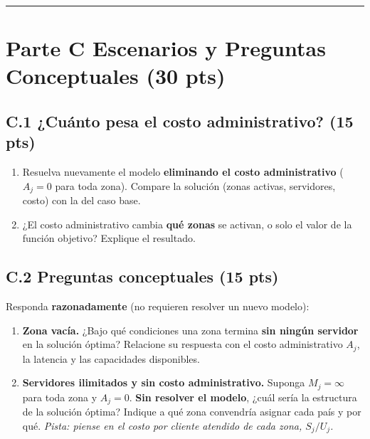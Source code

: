 \documentclass[12pt,a4paper]{article}
\begin{document}
\noindent\rule{\linewidth}{0.4pt}
\newpage
\section*{Parte C \quad Escenarios y Preguntas Conceptuales \hfill\normalfont\normalsize(30 pts)}

\subsection*{C.1 \quad ¿Cuánto pesa el costo administrativo? \hfill\normalfont\normalsize(15 pts)}

\begin{enumerate}[label=\alph*), leftmargin=*, topsep=2pt]
    \item Resuelva nuevamente el modelo \textbf{eliminando el costo
          administrativo} ($A_j = 0$ para toda zona). Compare la solución
          (zonas activas, servidores, costo) con la del caso base.
    \item ¿El costo administrativo cambia \textbf{qué zonas} se activan, o solo
          el valor de la función objetivo? Explique el resultado.
\end{enumerate}

\subsection*{C.2 \quad Preguntas conceptuales \hfill\normalfont\normalsize(15 pts)}

Responda \textbf{razonadamente} (no requieren resolver un nuevo modelo):

\begin{enumerate}[label=\alph*), leftmargin=*, topsep=2pt]
    \item \textbf{Zona vacía.} ¿Bajo qué condiciones una zona termina
          \textbf{sin ningún servidor} en la solución óptima? Relacione su
          respuesta con el costo administrativo $A_j$, la latencia y las
          capacidades disponibles.
    \item \textbf{Servidores ilimitados y sin costo administrativo.} Suponga
          $M_j = \infty$ para toda zona y $A_j = 0$. \textbf{Sin resolver el
          modelo}, ¿cuál sería la estructura de la solución óptima? Indique a
          qué zona convendría asignar cada país y por qué. \emph{Pista: piense
          en el costo por cliente atendido de cada zona, $S_j / U_j$.}
\end{enumerate}
\end{document}
